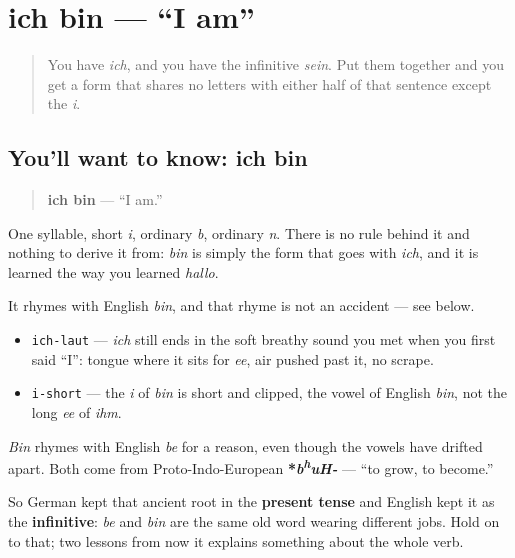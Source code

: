 \section[ich bin]{ich bin — \textquotedblleft{}I am\textquotedblright{}}

\label{lesson:GE-C16-ich-bin}



\begin{quote}
You have \emph{ich}, and you have the infinitive \emph{sein}. Put them together and you get a form that shares no letters with either half of that sentence except the \emph{i}.
\end{quote}

\subsection*{You'll want to know: ich bin}
\begin{quote}
\textbf{ich bin} — \textquotedblleft{}I am.\textquotedblright{}
\end{quote}

One syllable, short \emph{i}, ordinary \emph{b}, ordinary \emph{n}. There is no rule behind it and nothing to derive it from: \emph{bin} is simply the form that goes with \emph{ich}, and it is learned the way you learned \emph{hallo}.

It rhymes with English \emph{bin}, and that rhyme is not an accident — see below.

\begin{sounds}
\begin{itemize}
\raggedright
  \item \texttt{ich-laut} — \emph{ich} still ends in the soft breathy sound you met when you first said \textquotedblleft{}I\textquotedblright{}: tongue where it sits for \emph{ee}, air pushed past it, no scrape.
  \item \texttt{i-short} — the \emph{i} of \emph{bin} is short and clipped, the vowel of English \emph{bin}, not the long \emph{ee} of \emph{ihm}.
\end{itemize}
\end{sounds}

\begin{cousinweb}
\emph{Bin} rhymes with English \emph{be} for a reason, even though the vowels have drifted apart. Both come from Proto-Indo-European \textbf{*\emph{b\textsuperscript{h}uH-}} — \textquotedblleft{}to grow, to become.\textquotedblright{}

So German kept that ancient root in the \textbf{present tense} and English kept it as the \textbf{infinitive}: \emph{be} and \emph{bin} are the same old word wearing different jobs. Hold on to that; two lessons from now it explains something about the whole verb.
\end{cousinweb}

